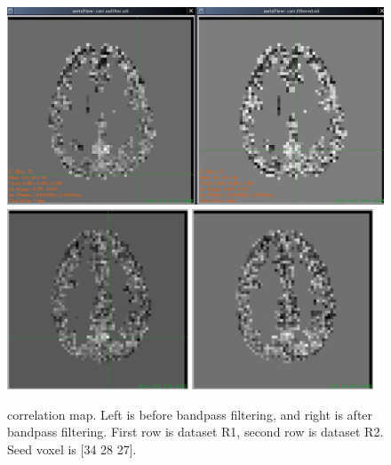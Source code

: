 \documentclass[12pt]{article}
\begin{document}
\begin{figure}[htb]
\includegraphics[width = 1\textwidth]{figures2/corrmap_both}\\
\includegraphics[width = 0.48\textwidth]{figures2/corrmap_nofilter_R2}
\includegraphics[width = 0.48\textwidth]{figures2/corrmap_filtered_R2}\\
\caption{correlation map. Left is before bandpass filtering, and right is after bandpass filtering. First row is dataset R1, second row is dataset R2. Seed voxel is [34 28 27].}
\label{fig105}
\end{figure}
\end{document}
